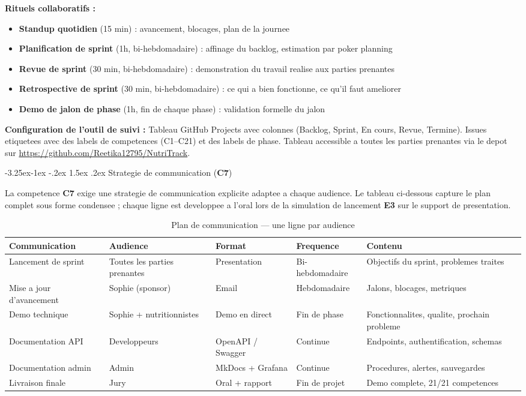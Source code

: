 \documentclass[a4paper,11pt,oneside,openany]{report}
\makeatletter
\renewcommand\subsection{\@startsection{subsection}{2}{\z@}%
  {-3.25ex\@plus -1ex \@minus -.2ex}%
  {1.5ex \@plus .2ex}%
  {\normalfont\large\bfseries\color{ntdarkgreen}}}
\newcommand{\competence}[1]{\textbf{\textcolor{ntgreen}{#1}}}
\newcommand{\evaluation}[1]{\textbf{\textcolor{ntblue}{#1}}}
\makeatother
\begin{document}
\textbf{Rituels collaboratifs :}
\begin{itemize}[nosep]
  \item \textbf{Standup quotidien} (15 min) : avancement, blocages, plan de la journee
  \item \textbf{Planification de sprint} (1h, bi-hebdomadaire) : affinage du backlog, estimation par poker planning
  \item \textbf{Revue de sprint} (30 min, bi-hebdomadaire) : demonstration du travail realise aux parties prenantes
  \item \textbf{Retrospective de sprint} (30 min, bi-hebdomadaire) : ce qui a bien fonctionne, ce qu'il faut ameliorer
  \item \textbf{Demo de jalon de phase} (1h, fin de chaque phase) : validation formelle du jalon
\end{itemize}

\textbf{Configuration de l'outil de suivi :} Tableau GitHub Projects avec
colonnes (Backlog, Sprint, En cours, Revue, Termine). Issues etiquetees
avec des labels de competences (C1--C21) et des labels de phase. Tableau
accessible a toutes les parties prenantes via le depot sur
\url{https://github.com/Reetika12795/NutriTrack}.

\subsection{Strategie de communication (\competence{C7})}

La competence \competence{C7} exige une strategie de communication
explicite adaptee a chaque audience. Le tableau ci-dessous capture le
plan complet sous forme condensee ; chaque ligne est developpee a
l'oral lors de la simulation de lancement \evaluation{E3} sur le
support de presentation.

\begin{table}[H]
\centering
\caption{Plan de communication --- une ligne par audience}
\label{tab:comms}
\begin{tabularx}{\textwidth}{L{2.5cm} L{2.5cm} L{2cm} L{2cm} L{3.5cm}}
\toprule
\textbf{Communication} & \textbf{Audience} & \textbf{Format} & \textbf{Frequence} & \textbf{Contenu} \\
\midrule
Lancement de sprint & Toutes les parties prenantes & Presentation & Bi-hebdomadaire & Objectifs du sprint, problemes traites \\
Mise a jour d'avancement & Sophie (sponsor) & Email & Hebdomadaire & Jalons, blocages, metriques \\
Demo technique & Sophie + nutritionnistes & Demo en direct & Fin de phase & Fonctionnalites, qualite, prochain probleme \\
Documentation API & Developpeurs & OpenAPI / Swagger & Continue & Endpoints, authentification, schemas \\
Documentation admin & Admin & MkDocs + Grafana & Continue & Procedures, alertes, sauvegardes \\
Livraison finale & Jury & Oral + rapport & Fin de projet & Demo complete, 21/21 competences \\
\bottomrule
\end{tabularx}
\end{table}
\end{document}
